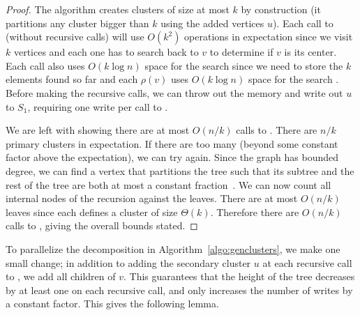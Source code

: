 \begin{proof}
The algorithm creates clusters of size at most $k$ by construction (it
partitions any cluster bigger than $k$ using the added vertices $u$).
Each call to  (without recursive calls) will use
$O(k^2)$ operations in expectation since we visit $k$ vertices and each one
has to search back to $v$ to determine if $v$ is its center.  Each
call also uses $O(k \log n)$ space for the search \whp{} since we need
to store the $k$ elements found so far and each $\rho(v)$ uses $O(k
\log n)$ space for the search \whp{}.  Before making the recursive
calls, we can throw out the \local{} memory and write out $u$ to $S_1$,
requiring one write per call to .

We are left with showing there are at most $O(n/k)$ calls to
.  There are $n/k$ primary clusters in
expectation.  If there are too many (beyond some constant factor above
the expectation), we can try again.  Since the graph has bounded
degree, we can find a vertex that partitions
the tree such that its subtree and the rest of the tree are both at
most a constant fraction~\cite{rosenberg2001graph}.  We can now count all internal nodes
of the recursion against the leaves.  There are at most $O(n/k)$
leaves since each defines a cluster of size $\Theta(k)$.  Therefore
there are $O(n/k)$ calls to , giving the overall
bounds stated.
\end{proof}

To parallelize the decomposition in Algorithm~\ref{algo:genclusters},
we make one small change; in addition to adding the
secondary cluster $u$ at each recursive call to ,
we add all children of $v$.  This guarantees that the height of the tree
decreases by at least one on each recursive call, and only increases
the number of writes by a constant factor.  This gives the following
lemma. %

